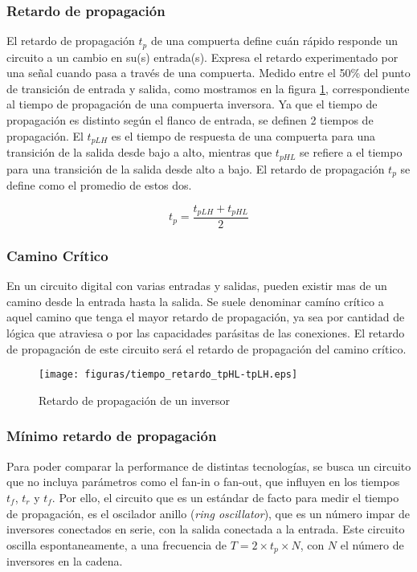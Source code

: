 \subsubsection{Retardo de propagación}
El retardo de propagación $t_p$ de una compuerta define cuán rápido responde un circuito a un cambio en su(s) entrada(s). Expresa el retardo experimentado por una señal cuando pasa a través de una compuerta. Medido entre el 50\% del punto de transición de entrada y salida, como mostramos en la figura \ref{fig:propagationDelay}, correspondiente al tiempo de propagación de una compuerta inversora. Ya que el tiempo de propagación es distinto según el flanco de entrada, se definen 2 tiempos de propagación. El $t_{pLH}$ es el tiempo de respuesta de una compuerta  para una transición de la salida desde bajo a alto, mientras que $t_{pHL}$ se refiere a el tiempo para una transición de la salida desde alto a bajo. El retardo de propagación $t_p$ se define como el promedio de estos dos.

$$ t_p = \frac{t_{pLH} + t_{pHL}}{2} $$

\subsubsection{Camino Crítico}
En un circuito digital con varias entradas y salidas, pueden existir mas de un camino desde la entrada hasta la salida. Se suele denominar camíno crítico a aquel camino que tenga el mayor retardo de propagación, ya sea por cantidad de lógica que atraviesa o por las capacidades parásitas de las conexiones. El retardo de propagación de este circuito será el retardo de propagación del camino crítico.


\begin{figure}[h]
\centering
\texttt{[image: figuras/tiempo\_retardo\_tpHL-tpLH.eps]}
  \caption{Retardo de propagación de un inversor}
  \label{fig:propagationDelay}
\end{figure}



\subsubsection{Mínimo retardo de propagación}

Para poder comparar la performance de distintas tecnologías, se busca un circuito que no incluya parámetros como el fan-in o fan-out, que influyen en los tiempos $t_f$, $t_r$ y $t_f$. Por ello, el circuito que es un estándar de facto para medir el tiempo de propagación, es el oscilador anillo (\emph{ring oscillator}), que es un número impar de inversores conectados en serie, con la salida conectada a la entrada. Este circuito oscilla espontaneamente, a una frecuencia de $T = 2 \times t_p \times N$, con $N$ el número de inversores en la cadena. 

